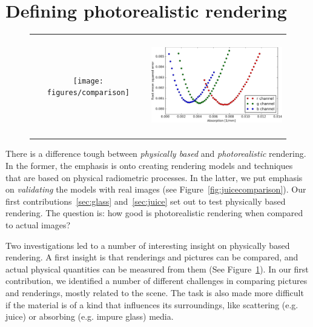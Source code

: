 \section{Defining photorealistic rendering}
\begin{figure}
\begin{tabular}{@{}c@{}c@{}}
	 \texttt{[image: figures/comparison]} & \hspace{2em}
	 \includegraphics[height=4.3cm]{figures/glass_bowl_analysis_by_synthesis}  \\
\end{tabular}
\caption{} %
\label{fig:glasscomparison}
\end{figure}

There is a difference tough between \emph{physically based} and \emph{photorealistic} rendering. In the former, the emphasis is onto creating rendering models and techniques that are based on physical radiometric processes. In the latter, we put emphasis on \emph{validating} the models with real images (see Figure~\ref{fig:juicecomparison}). Our first contributions~\ref{sec:glass} and~\ref{sec:juice} set out to test physically based rendering. The question is: how good is photorealistic rendering when compared to actual images?

Two investigations led to a number of interesting insight on physically based rendering. A first insight is that renderings and pictures can be compared, and actual physical quantities can be measured from them (See Figure~\ref{fig:glasscomparison}). In our first contribution, we identified a number of different challenges in comparing pictures and renderings, mostly related to the scene. The task is also made more difficult if the material is of a kind that influences its surroundings, like scattering (e.g. juice) or absorbing (e.g. impure glass) media. 


